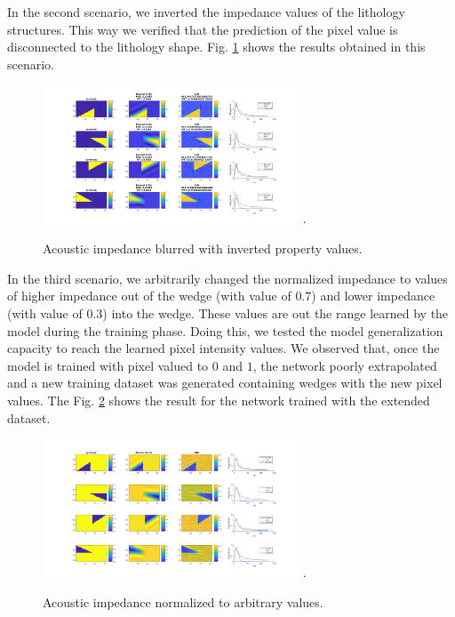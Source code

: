 \documentclass[conference,compsoc]{IEEEtran}
\begin{document}
In the second scenario, we inverted the impedance values of the lithology structures.
This way we verified that the prediction of the pixel value is disconnected to the lithology shape.
Fig. \ref{fig_scenario6} shows the results obtained in this scenario.
\begin{figure}[!t]
\centering
\includegraphics[width=3.0in]{Figs/Caso6}
\DeclareGraphicsExtensions.
\caption{Acoustic impedance blurred with inverted property values.}
\label{fig_scenario6}
\end{figure}

In the third scenario, we arbitrarily changed the normalized impedance to values
of higher impedance out of the wedge (with value of $0.7$) and lower impedance (with value of $0.3$)
into the wedge. These values are out the range learned by the model during the training phase.
Doing this, we tested the model generalization capacity to reach the learned pixel intensity values.
We observed that, once the model is trained with pixel valued to $0$ and $1$, the network poorly
extrapolated and a new training dataset was generated containing wedges with the new pixel values.
The Fig. \ref{fig_scenario2} shows the result for the network trained with the extended dataset.
\begin{figure}[!t]
\centering
\includegraphics[width=3.0in]{Figs/Caso2}
\DeclareGraphicsExtensions.
\caption{Acoustic impedance normalized to arbitrary values.}
\label{fig_scenario2}
\end{figure}

\end{document}
